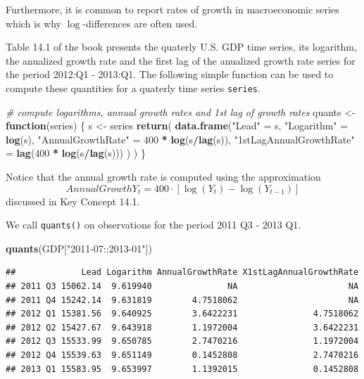 \documentclass[]{book}
\newenvironment{Shaded}{\begin{snugshade}}{\end{snugshade}}
\newcommand{\KeywordTok}[1]{\textcolor[rgb]{0.13,0.29,0.53}{\textbf{#1}}}
\newcommand{\DecValTok}[1]{\textcolor[rgb]{0.00,0.00,0.81}{#1}}
\newcommand{\StringTok}[1]{\textcolor[rgb]{0.31,0.60,0.02}{#1}}
\newcommand{\CommentTok}[1]{\textcolor[rgb]{0.56,0.35,0.01}{\textit{#1}}}
\newcommand{\ControlFlowTok}[1]{\textcolor[rgb]{0.13,0.29,0.53}{\textbf{#1}}}
\newcommand{\OperatorTok}[1]{\textcolor[rgb]{0.81,0.36,0.00}{\textbf{#1}}}
\newcommand{\NormalTok}[1]{#1}
\theoremstyle{definition}
\theoremstyle{definition}
\theoremstyle{definition}
\theoremstyle{remark}
\begin{document}
Furthermore, it is common to report rates of growth in macroeconomic
series which is why \(\log\)-differences are often used.

Table 14.1 of the book presents the quaterly U.S. GDP time series, its
logarithm, the anualized growth rate and the first lag of the anualized
growth rate series for the period 2012:Q1 - 2013:Q1. The following
simple function can be used to compute these quantities for a quaterly
time series \texttt{series}.

\begin{Shaded}
\begin{Highlighting}[]
\CommentTok{# compute logarithms, annual growth rates and 1st lag of growth rates}
\NormalTok{quants <-}\StringTok{ }\ControlFlowTok{function}\NormalTok{(series) \{}
\NormalTok{  s <-}\StringTok{ }\NormalTok{series}
  \KeywordTok{return}\NormalTok{(}
    \KeywordTok{data.frame}\NormalTok{(}\StringTok{"Lead"}\NormalTok{ =}\StringTok{ }\NormalTok{s,}
               \StringTok{"Logarithm"}\NormalTok{ =}\StringTok{ }\KeywordTok{log}\NormalTok{(s),}
               \StringTok{"AnnualGrowthRate"}\NormalTok{ =}\StringTok{ }\DecValTok{400} \OperatorTok{*}\StringTok{ }\KeywordTok{log}\NormalTok{(s}\OperatorTok{/}\KeywordTok{lag}\NormalTok{(s)),}
               \StringTok{"1stLagAnnualGrowthRate"}\NormalTok{ =}\StringTok{ }\KeywordTok{lag}\NormalTok{(}\DecValTok{400} \OperatorTok{*}\StringTok{ }\KeywordTok{log}\NormalTok{(s}\OperatorTok{/}\KeywordTok{lag}\NormalTok{(s)))}
\NormalTok{      )}
\NormalTok{  )}
\NormalTok{\}}
\end{Highlighting}
\end{Shaded}

Notice that the annual growth rate is computed using the approximation
\[ Annual Growth Y_t = 400 \cdot \left[\log(Y_t) - \log(Y_{t-1})\right] \]
discussed in Key Concept 14.1.

We call \texttt{quants()} on observations for the period 2011 Q3 - 2013
Q1.

\begin{Shaded}
\begin{Highlighting}[]
\KeywordTok{quants}\NormalTok{(GDP[}\StringTok{"2011-07::2013-01"}\NormalTok{])}
\end{Highlighting}
\end{Shaded}

\begin{verbatim}
##             Lead Logarithm AnnualGrowthRate X1stLagAnnualGrowthRate
## 2011 Q3 15062.14  9.619940               NA                      NA
## 2011 Q4 15242.14  9.631819        4.7518062                      NA
## 2012 Q1 15381.56  9.640925        3.6422231               4.7518062
## 2012 Q2 15427.67  9.643918        1.1972004               3.6422231
## 2012 Q3 15533.99  9.650785        2.7470216               1.1972004
## 2012 Q4 15539.63  9.651149        0.1452808               2.7470216
## 2013 Q1 15583.95  9.653997        1.1392015               0.1452808
\end{verbatim}
\end{document}
